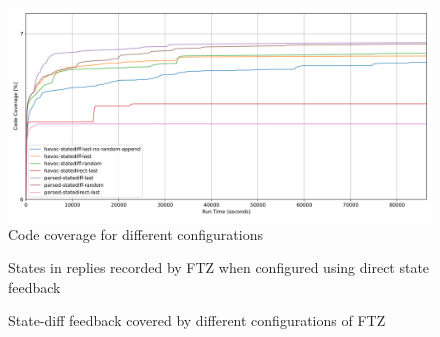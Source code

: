 \documentclass[twocolumn]{article}
\newcommand{\proj}{FTZ\xspace}
\begin{document}
\begin{figure}[t]
  \centering
  \includegraphics[width=\textwidth]{assets/eval/coverage-observer-by-run_time-plot.png}
  \caption{Code coverage for different configurations}
  \label{fig:eval-cov}
\end{figure}
\begin{figure}
  \caption{States in replies recorded by \proj when configured using direct state feedback}
  \label{fig:eval-state-cov}
\end{figure}
\begin{figure}
  \caption{State-diff feedback covered by different configurations of \proj}
  \label{fig:eval-state-diff-map}
\end{figure}
\end{document}
